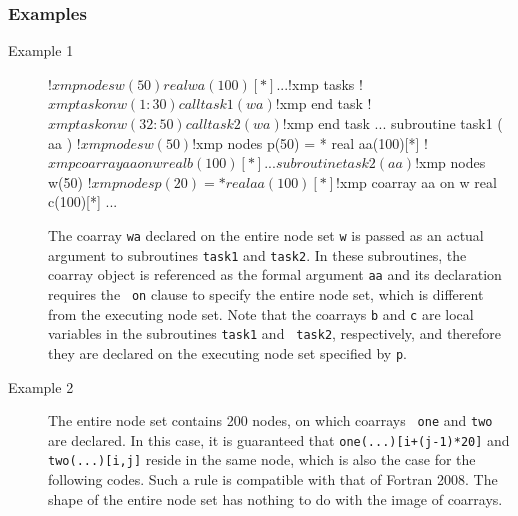 \subsubsection*{Examples}

\begin{description}
\item[Example 1]
\hspace{\hsize}
\begin{XFexample}
!$xmp nodes w(50)
      real wa(100)[*]
      ...
!$xmp tasks
!$xmp task on w(1:30)
      call task1 ( wa )
!$xmp end task
!$xmp task on w(32:50)
      call task2 ( wa )
!$xmp end task
      ...
      subroutine task1 ( aa )
!$xmp nodes w(50)
!$xmp nodes p(50) = *
      real aa(100)[*]
!$xmp coarray aa on w
      real b(100)[*] 
      ...
      subroutine task2 ( aa )
!$xmp nodes w(50)
!$xmp nodes p(20) = *
      real aa(100)[*]
!$xmp coarray aa on w
      real c(100)[*] 
      ...
\end{XFexample}

	   The coarray {\tt wa} declared on the entire node set {\tt w}
	   is passed as an actual argument to subroutines {\tt task1}
	   and {\tt task2}.
	   In these subroutines, the coarray object is referenced as the
	   formal argument {\tt aa} and its declaration requires the {\tt
	   on} clause to specify the entire node set, which is
	   different from the executing node set.
	   Note that the coarrays {\tt b} and {\tt c} are
	   local variables in the subroutines {\tt task1} and {\tt
	   task2}, respectively, and therefore they are declared on the
	   executing node set specified by {\tt p}.

\item[Example 2]
\hspace{\hsize}


	   The entire node set contains 200 nodes, on which coarrays {\tt
	   one} and {\tt two} are declared. In this case, it is
	   guaranteed that {\tt one(...)[i+(j-1)*20]} and {\tt
	   two(...)[i,j]} reside in the same node, which is also the
	   case for the following codes. Such a rule is compatible with
	   that of Fortran 2008. The shape of the entire node set has
	   nothing to do with the image of coarrays.


\end{description}

